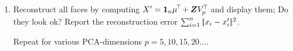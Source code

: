 \begin{enumerate}
\item Reconstruct all faces by computing $X' = {{\bf 1}}_n \mu^{\!\top\!} + \boldsymbol Z V_p^{\!\top\!}$ and
display them; Do they look ok? Report the reconstruction error $\sum_{i=1}^n
|\!|x_i - x'_i|\!|^2$.

Repeat for various PCA-dimensions $p=5, 10, 15, 20\ldots$.


\end{enumerate}


\exerfoot
